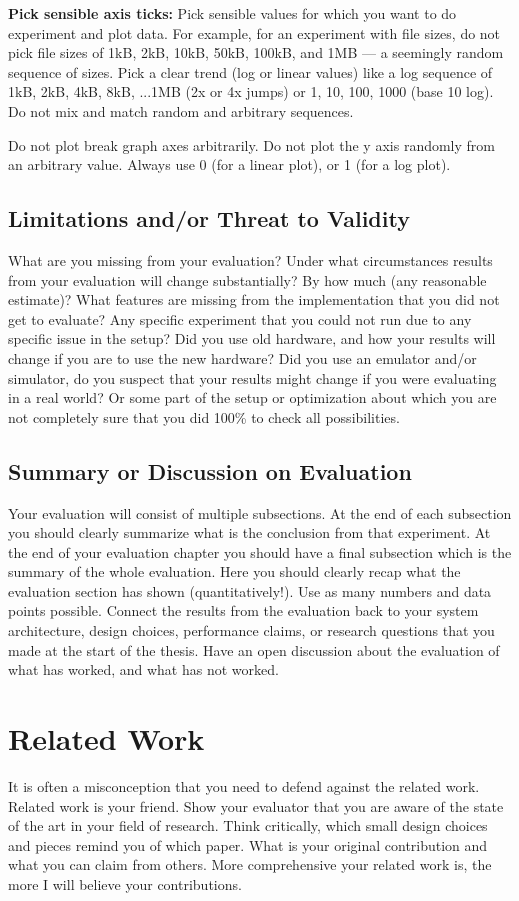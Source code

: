 \documentclass{article}
\begin{document}
\textbf{Pick sensible axis ticks:} Pick sensible values for which you want to do experiment and plot data. For example, for an experiment with file sizes, do not pick file sizes of 1kB, 2kB, 10kB, 50kB, 100kB, and 1MB --- a seemingly random sequence of sizes. Pick a clear trend (log or linear values) like  a log sequence of 1kB, 2kB, 4kB, 8kB, ...1MB (2x or 4x jumps) or 1, 10, 100, 1000 (base 10 log). Do not mix and match random and arbitrary sequences. 

Do not plot break graph axes arbitrarily. Do not plot the y axis randomly from an arbitrary value. Always use 0 (for a linear plot), or 1 (for a log plot).  

\subsection{Limitations and/or Threat to Validity}
What are you missing from your evaluation? Under what circumstances results from your evaluation will change substantially? By how much (any reasonable estimate)? What features are missing from the implementation that you did not get to evaluate? Any specific experiment that you could not run due to any specific issue in the setup? Did you use old hardware, and how your results will change if you are to use the new hardware? Did you use an emulator and/or simulator, do you suspect that your results might change if you were evaluating in a real world? Or some part of the setup or optimization about which you are not completely sure that you did 100\% to check all possibilities. 

\subsection{Summary or Discussion on Evaluation}
Your evaluation will consist of multiple subsections. At the end of each subsection you should clearly summarize what is the conclusion from that experiment. At the end of your evaluation chapter you should have a final subsection which is the summary of the whole evaluation. Here you should clearly recap what the evaluation section has shown (quantitatively!). Use as many numbers and data points possible. Connect the results from the evaluation back to your system architecture, design choices, performance claims, or research questions that you made at the start of the thesis. Have an open discussion about the evaluation of what has worked, and what has not worked. 

\newpage 
\section{Related Work}
It is often a misconception that you need to defend against the related work. Related work is your friend. Show your evaluator that you are aware of the state of the art in your field of research. Think critically, which small design choices and pieces remind you of which paper. What is your original contribution and what you can claim from others. More comprehensive your related work is, the more I will believe your contributions. 
\end{document}
